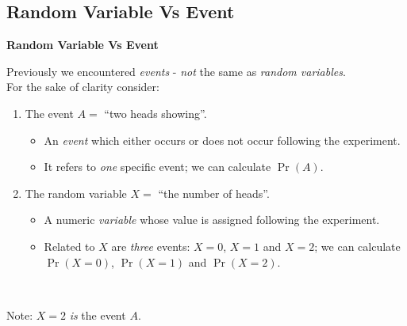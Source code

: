 \documentclass[compress]{beamer}        %
\makeatletter
\newcommand{\tcb}{\textcolor{beamer@blendedblue}}
\makeatother
\begin{document}
\subsection{Random Variable Vs Event}
\begin{frame}{\bf \tcb{Random Variable Vs Event}}

Previously we encountered \emph{events} - \emph{not} the same as \emph{random variables}.\\[0.4cm]

For the sake of clarity consider:\\[-0.1cm]
\begin{enumerate}[1.]\itemsep0.4cm
\item The event $A = $ ``two heads showing''.\\[-0.05cm]
\begin{itemize}\itemsep0.2cm
\item An \emph{event} which either occurs or does not occur following the experiment.
\item It refers to \emph{one} specific event; we can calculate $\Pr(A)$.
\end{itemize}
\item The random variable $X = $ ``the number of heads''.\\[-0.05cm]
\begin{itemize}\itemsep0.2cm
\item  A numeric \emph{variable} whose value is assigned following the experiment.
\item Related to $X$ are \emph{three} events: $X=0$, $X=1$ and $X=2$; we can calculate $\Pr(X=0)$, $\Pr(X=1)$ and $\Pr(X=2)$.\\[0.2cm]
\end{itemize}\
\end{enumerate}

Note: $X=2$ \emph{is} the event $A$.

\end{frame}
\end{document}
